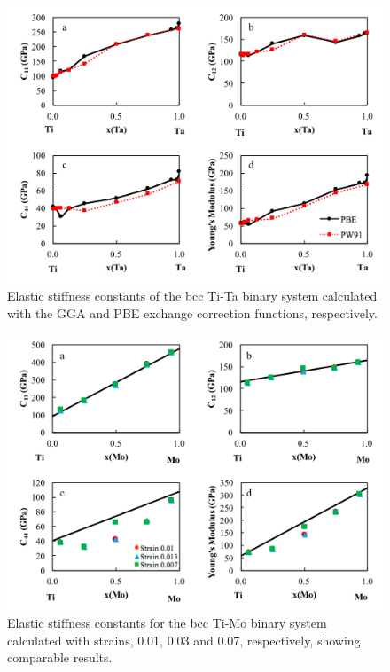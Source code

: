 \pagebreak
\begin{figure}[H]
	\centering
	\includegraphics[width=\textwidth]{Chapter-5/Figures/PBEvsPW91.png}
	\caption{Elastic stiffness constants of the bcc Ti-Ta binary system calculated with the GGA and PBE exchange correction functions, respectively.}
	\label{Ch5-figure:PBEvsPW91}
\end{figure}

\pagebreak
\begin{figure}[H]
	\centering
	\includegraphics[width=\textwidth]{Chapter-5/Figures/Strain.png}
	\caption{Elastic stiffness constants for the bcc Ti-Mo binary system calculated with strains, 0.01, 0.03 and 0.07, respectively, showing comparable results.}
	\label{Ch5-figure:Strain}
\end{figure}

